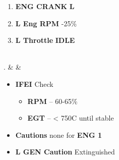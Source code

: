 \documentclass[fontInter, widesubsec]{TechCheck}
\begin{document}
\begin{listlongtable}
\begin{minipage}[t]{\linewidth}
\begin{enumerate}
				\item \textbf{ENG CRANK} \dotfill \textbf{L}
				\item \textbf{L Eng RPM} -25\%
				\item \textbf{L Throttle} \dotfill \textbf{IDLE}
			\end{enumerate}
		\end{minipage} \\
		. &  &
		\begin{minipage}[t]{\linewidth}
			\vspace{-7pt}
			\begin{itemize}
				\item \textbf{IFEI} \dotfill Check
				\begin{itemize}
					\item \textbf{RPM} -- 60-65\%
					\item \textbf{EGT} -- < 750C until stable
				\end{itemize}
				\item \textbf{Cautions} \dotfill none for \textbf{ENG 1}
				\item \textbf{L GEN Caution} \dotfill Extinguished
			\end{itemize}
		\end{minipage} \\
	\end{listlongtable}
\end{document}
